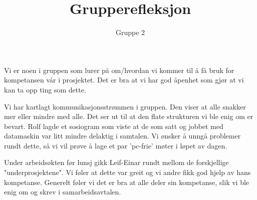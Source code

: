 \documentclass[11pt]{article} %
\title{Grupperefleksjon}
\author{Gruppe 2}
\begin{document}
\maketitle 

Vi er noen i gruppen som lurer på om/hvordan vi kommer til å få bruk for kompetansen vår i prosjektet. Det er bra at vi har god åpenhet som gjør at vi kan ta opp ting som dette. 

Vi har kartlagt kommunikasjonsstrømmen i gruppen. Den viser at alle snakker mer eller mindre med alle. Det ser ut til at den flate strukturen vi ble enig om er bevart. Rolf lagde et sosiogram som viste at de som satt og jobbet med datamaskin var litt mindre delaktig i samtalen. Vi ønsker å unngå problemer rundt dette, så vi vil prøve å lage et par 'pc-frie' møter i løpet av dagen.

Under arbeidsøkten før lunsj gikk Leif-Einar rundt mellom de forskjellige "underprosjektene". Vi føler at dette var greit og vi andre fikk god hjelp av hans kompetanse. Generelt føler vi det er bra at alle deler sin kompetanse, slik vi ble enig om og skrev i samarbeidsavtalen.
\end{document}
